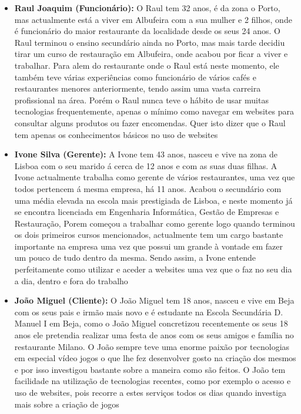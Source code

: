 \begin{itemize}
    \item \textbf{Raul Joaquim (Funcionário):} O Raul tem 32 anos, é da zona o Porto, mas actualmente está a viver em Albufeira com a sua mulher e 2 filhos, onde é funcionário do maior restaurante da localidade desde os seus 24 anos. O Raul terminou o ensino secundário ainda no Porto, mas mais tarde decidiu tirar um curso de restauração em Albufeira, onde acabou por ficar a viver e trabalhar. Para alem do restaurante onde o Raul está neste momento, ele também teve várias experiências como funcionário de vários cafés e restaurantes menores anteriormente, tendo assim uma vasta carreira profissional na área. Porém o Raul nunca teve o hábito de usar muitas tecnologias frequentemente, apenas o mínimo como navegar em websites para consultar alguns produtos ou fazer encomendas. Quer isto dizer que o Raul tem apenas os conhecimentos básicos no uso de websites
    \item \textbf{Ivone Silva (Gerente):} A Ivone tem 43 anos, nasceu e vive na zona de Lisboa com o seu marido á cerca de 12 anos e com as suas duas filhas. A Ivone actualmente trabalha como gerente de vários restaurantes, uma vez que todos pertencem á mesma empresa, há 11 anos. Acabou o secundário com uma média elevada na escola mais prestigiada de Lisboa, e neste momento já se encontra licenciada em Engenharia Informática, Gestão de Empresas e Restauração, Porem começou a trabalhar como gerente logo quando terminou os dois primeiros cursos mencionados, actualmente tem um cargo bastante importante na empresa uma vez que possui um grande à vontade em fazer um pouco de tudo dentro da mesma. Sendo assim, a Ivone entende perfeitamente como utilizar e aceder a websites uma vez que o faz no seu dia a dia, dentro e fora do trabalho
    \item \textbf{João Miguel (Cliente):} O João Miguel tem 18 anos, nasceu e vive em Beja com os seus pais e irmão mais novo e é estudante na Escola Secundária D. Manuel I em Beja, como o João Miguel concretizou recentemente os seus 18 anos ele pretendia realizar uma festa de anos com os seus amigos e família no restaurante Milano. O João sempre teve uma enorme paixão por tecnologias em especial vídeo jogos o que lhe fez desenvolver gosto na criação dos mesmos e por isso investigou bastante sobre a maneira como são feitos. O João tem facilidade na utilização de tecnologias recentes, como por exemplo o acesso e uso de websites, pois recorre a estes serviços todos os dias quando investiga mais sobre a criação de jogos
\end{itemize}

